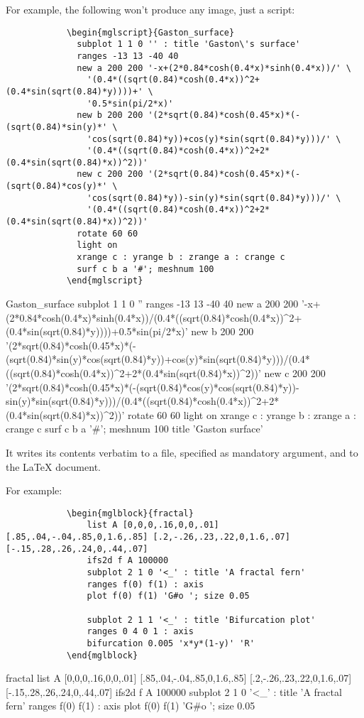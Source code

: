 \documentclass{article}
\begin{document}
\begin{description}
		For example, the following won't produce any image, just a script:
		\begin{verbatim}
			\begin{mglscript}{Gaston_surface}
			  subplot 1 1 0 '' : title 'Gaston\'s surface'
			  ranges -13 13 -40 40
			  new a 200 200 '-x+(2*0.84*cosh(0.4*x)*sinh(0.4*x))/' \
			    '(0.4*((sqrt(0.84)*cosh(0.4*x))^2+(0.4*sin(sqrt(0.84)*y))))+' \
			    '0.5*sin(pi/2*x)'
			  new b 200 200 '(2*sqrt(0.84)*cosh(0.45*x)*(-(sqrt(0.84)*sin(y)*' \
			    'cos(sqrt(0.84)*y))+cos(y)*sin(sqrt(0.84)*y)))/' \
			    '(0.4*((sqrt(0.84)*cosh(0.4*x))^2+2*(0.4*sin(sqrt(0.84)*x))^2))'
			  new c 200 200 '(2*sqrt(0.84)*cosh(0.45*x)*(-(sqrt(0.84)*cos(y)*' \
			    'cos(sqrt(0.84)*y))-sin(y)*sin(sqrt(0.84)*y)))/' \
			    '(0.4*((sqrt(0.84)*cosh(0.4*x))^2+2*(0.4*sin(sqrt(0.84)*x))^2))'
			  rotate 60 60
			  light on
			  xrange c : yrange b : zrange a : crange c
			  surf c b a '#'; meshnum 100
			\end{mglscript}
		\end{verbatim}
		\begin{mglscript}{Gaston_surface}
			subplot 1 1 0 ''
			ranges -13 13 -40 40
			new a 200 200 '-x+(2*0.84*cosh(0.4*x)*sinh(0.4*x))/(0.4*((sqrt(0.84)*cosh(0.4*x))^2+(0.4*sin(sqrt(0.84)*y))))+0.5*sin(pi/2*x)'
			new b 200 200 '(2*sqrt(0.84)*cosh(0.45*x)*(-(sqrt(0.84)*sin(y)*cos(sqrt(0.84)*y))+cos(y)*sin(sqrt(0.84)*y)))/(0.4*((sqrt(0.84)*cosh(0.4*x))^2+2*(0.4*sin(sqrt(0.84)*x))^2))'
			new c 200 200 '(2*sqrt(0.84)*cosh(0.45*x)*(-(sqrt(0.84)*cos(y)*cos(sqrt(0.84)*y))-sin(y)*sin(sqrt(0.84)*y)))/(0.4*((sqrt(0.84)*cosh(0.4*x))^2+2*(0.4*sin(sqrt(0.84)*x))^2))'
			rotate 60 60
			light on
			xrange c : yrange b : zrange a : crange c
			surf c b a '#'; meshnum 100
			title 'Gaston surface'
		\end{mglscript}
		
		\item[mglblock] It writes its contents verbatim to a file, specified as mandatory argument, and to the \LaTeX{} document.
		
		For example:
		\begin{verbatim}
			\begin{mglblock}{fractal}
				list A [0,0,0,.16,0,0,.01] [.85,.04,-.04,.85,0,1.6,.85] [.2,-.26,.23,.22,0,1.6,.07] [-.15,.28,.26,.24,0,.44,.07]
				ifs2d f A 100000
				subplot 2 1 0 '<_' : title 'A fractal fern'
				ranges f(0) f(1) : axis
				plot f(0) f(1) 'G#o '; size 0.05
				
				subplot 2 1 1 '<_' : title 'Bifurcation plot'
				ranges 0 4 0 1 : axis
				bifurcation 0.005 'x*y*(1-y)' 'R'
			\end{mglblock}
		\end{verbatim}
\begin{mglblock}{fractal}
list A [0,0,0,.16,0,0,.01] [.85,.04,-.04,.85,0,1.6,.85] [.2,-.26,.23,.22,0,1.6,.07] [-.15,.28,.26,.24,0,.44,.07]
ifs2d f A 100000
subplot 2 1 0 '<_' : title 'A fractal fern'
ranges f(0) f(1) : axis
plot f(0) f(1) 'G#o '; size 0.05


\end{mglblock}
\end{description}
\end{document}
